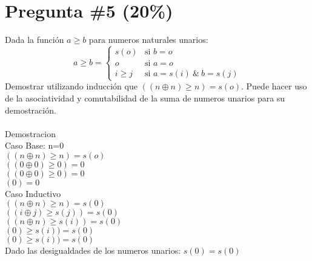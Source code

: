 \documentclass[10pt,a4paper]{article}
\begin{document}
\section*{Pregunta \#5 (20\%)}
Dada la funci\'on $a\geq b$ para numeros naturales unarios:
\[
        a\geq b =
                \left\{
                        \begin{array}{ll}
                                s(o)  & \mbox{si } b = o \\
                                o & \mbox{si } a = o \\
                                i\geq j & \mbox{si } a = s(i)\ \&\ b = s(j)
                        \end{array}
                \right.
\]
Demostrar utilizando inducci\'on que $((n\oplus n)\geq n) = s(o)$. Puede
hacer uso de la asociatividad y comutabilidad de la suma de numeros
unarios para su demostraci\'on.  \\\\
Demostracion\\
Caso Base: 
n=0\\ 
$((n\oplus n)\geq n) = s(o)$ \\
$((0\oplus 0)\geq 0) = 0$ \\
$((0\oplus 0)\geq 0) = 0$ \\
$(0) = 0$ \\

Caso Inductivo \\
$((n\oplus n)\geq n) = s(0)$ \\
$((i \oplus j )\geq s(j)) = s(0)$ \\
$((n\oplus n)\geq s(i)) = s(0)$ \\
$(0)\geq s(i)) = s(0)$ \\
$(0)\geq s(i)) = s(0)$ \\
Dado las desigualdades de los numeros unarios:   
$ s(0) = s(0)$ \\
\end{document}
